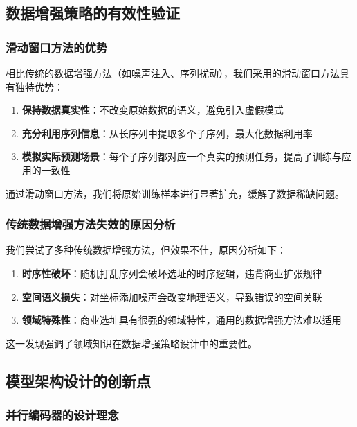\documentclass{article}
\begin{document}
\subsection{数据增强策略的有效性验证}

\subsubsection{滑动窗口方法的优势}

相比传统的数据增强方法（如噪声注入、序列扰动），我们采用的滑动窗口方法具有独特优势：

\begin{enumerate}
\item \textbf{保持数据真实性}：不改变原始数据的语义，避免引入虚假模式
\item \textbf{充分利用序列信息}：从长序列中提取多个子序列，最大化数据利用率
\item \textbf{模拟实际预测场景}：每个子序列都对应一个真实的预测任务，提高了训练与应用的一致性
\end{enumerate}

通过滑动窗口方法，我们将原始训练样本进行显著扩充，缓解了数据稀缺问题。

\subsubsection{传统数据增强方法失效的原因分析}

我们尝试了多种传统数据增强方法，但效果不佳，原因分析如下：

\begin{enumerate}
\item \textbf{时序性破坏}：随机打乱序列会破坏选址的时序逻辑，违背商业扩张规律
\item \textbf{空间语义损失}：对坐标添加噪声会改变地理语义，导致错误的空间关联
\item \textbf{领域特殊性}：商业选址具有很强的领域特性，通用的数据增强方法难以适用
\end{enumerate}

这一发现强调了领域知识在数据增强策略设计中的重要性。

\subsection{模型架构设计的创新点}

\subsubsection{并行编码器的设计理念}
\end{document}
